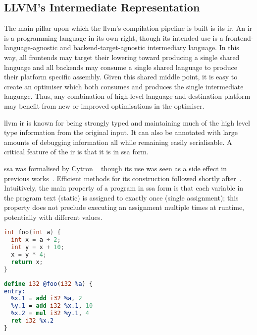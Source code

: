 \documentclass[\main/thesis.tex]{subfiles}
\begin{document}
\subsection{LLVM's Intermediate Representation}
\label{sec:ir}
The main pillar upon which the \gls{llvm}'s compilation pipeline is built is its \gls{ir}.
An \gls{ir} is a programming language in its own right, though its intended use is a frontend-language-agnostic and backend-target-agnostic intermediary language.
In this way, all frontends may target their \gls{lowering} toward producing a single shared language and all backends may consume a single shared language to produce their platform specific assembly.
Given this shared middle point, it is easy to create an optimiser which both consumes and produces the single intermediate language.
Thus, any combination of high-level language and destination platform may benefit from new or improved optimisations in the optimiser.

\Gls{llvm} \gls{ir} is known for being strongly typed and maintaining much of the high level type information from the original input.
It can also be annotated with large amounts of debugging information all while remaining easily serialisable.
A critical feature of the \gls{ir} is that it is in \gls{ssa} form.

\Gls{ssa} was formalised by Cytron \etal~\autocite{cytron1989efficient} though its use was seen as a side effect in previous works~\autocite{rosen1988global,alpern1988detecting}.
Efficient methods for its construction followed shortly after~\autocite{cytron1991efficiently,brandis1994single}.
Intuitively, the main property of a program in \gls{ssa} form is that each variable in the program text (static) is assigned to exactly once (single assignment); this property does not preclude executing an assignment multiple times at runtime, potentially with different values.

\noindent
\begin{minipage}[t]{0.45\linewidth}
\centering
\begin{lstlisting}[caption={[Example C Program, Pre-SSA Conversion.]An simple example C program, pre-conversion to SSA.},
      label=lst:cSSA,numbers=none,language=c,columns=flexible]
int foo(int a) {
  int x = a + 2;
  int y = x + 10;
  x = y * 4;
  return x;
}
\end{lstlisting}
\end{minipage}
\hspace{.025\linewidth}
\noindent
\begin{minipage}[t]{0.45\linewidth}
\centering
\begin{lstlisting}[caption={[Example LLVM IR Program, Post-SSA Conversion.]The same simple program, converted to LLVM IR in SSA format.},
      label=lst:llSSA,numbers=none,language=llvm,columns=flexible]
define i32 @foo(i32 %a) {
entry:
  %x.1 = add i32 %a, 2
  %y.1 = add i32 %x.1, 10
  %x.2 = mul i32 %y.1, 4
  ret i32 %x.2
}
\end{lstlisting}
\end{minipage}
\end{document}
